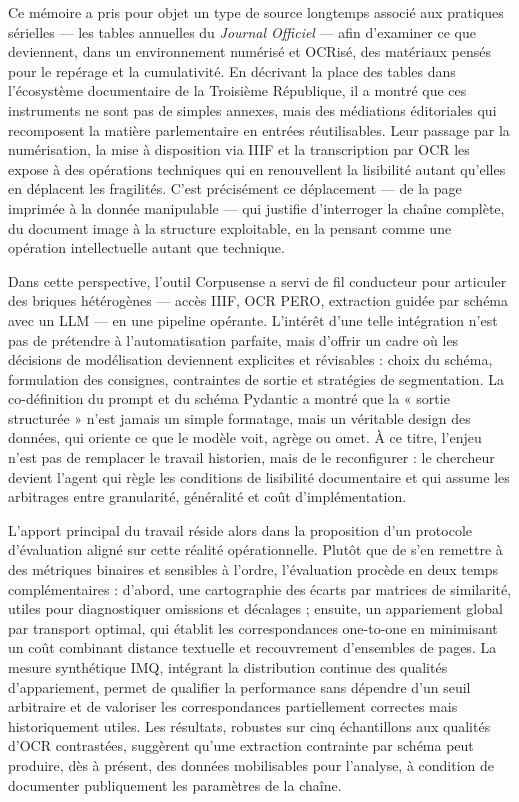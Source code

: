 \documentclass[12pt,twoside]{book}
\begin{document}
Ce mémoire a pris pour objet un type de source longtemps associé aux pratiques sérielles — les tables annuelles du \emph{Journal Officiel} — afin d’examiner ce que deviennent, dans un environnement numérisé et OCRisé, des matériaux pensés pour le repérage et la cumulativité. En décrivant la place des tables dans l’écosystème documentaire de la Troisième République, il a montré que ces instruments ne sont pas de simples annexes, mais des médiations éditoriales qui recomposent la matière parlementaire en entrées réutilisables. Leur passage par la numérisation, la mise à disposition via IIIF et la transcription par OCR les expose à des opérations techniques qui en renouvellent la lisibilité autant qu’elles en déplacent les fragilités. C’est précisément ce déplacement — de la page imprimée à la donnée manipulable — qui justifie d’interroger la chaîne complète, du document image à la structure exploitable, en la pensant comme une opération intellectuelle autant que technique.

Dans cette perspective, l’outil Corpusense a servi de fil conducteur pour articuler des briques hétérogènes — accès IIIF, OCR PERO, extraction guidée par schéma avec un LLM — en une pipeline opérante. L’intérêt d’une telle intégration n’est pas de prétendre à l’automatisation parfaite, mais d’offrir un cadre où les décisions de modélisation deviennent explicites et révisables : choix du schéma, formulation des consignes, contraintes de sortie et stratégies de segmentation. La co-définition du prompt et du schéma Pydantic a montré que la « sortie structurée » n’est jamais un simple formatage, mais un véritable design des données, qui oriente ce que le modèle voit, agrège ou omet. À ce titre, l’enjeu n’est pas de remplacer le travail historien, mais de le reconfigurer : le chercheur devient l’agent qui règle les conditions de lisibilité documentaire et qui assume les arbitrages entre granularité, généralité et coût d’implémentation.

L’apport principal du travail réside alors dans la proposition d’un protocole d’évaluation aligné sur cette réalité opérationnelle. Plutôt que de s’en remettre à des métriques binaires et sensibles à l’ordre, l’évaluation procède en deux temps complémentaires : d’abord, une cartographie des écarts par matrices de similarité, utiles pour diagnostiquer omissions et décalages ; ensuite, un appariement global par transport optimal, qui établit les correspondances one-to-one en minimisant un coût combinant distance textuelle et recouvrement d’ensembles de pages. La mesure synthétique IMQ, intégrant la distribution continue des qualités d’appariement, permet de qualifier la performance sans dépendre d’un seuil arbitraire et de valoriser les correspondances partiellement correctes mais historiquement utiles. Les résultats, robustes sur cinq échantillons aux qualités d’OCR contrastées, suggèrent qu’une extraction contrainte par schéma peut produire, dès à présent, des données mobilisables pour l’analyse, à condition de documenter publiquement les paramètres de la chaîne.
\end{document}
